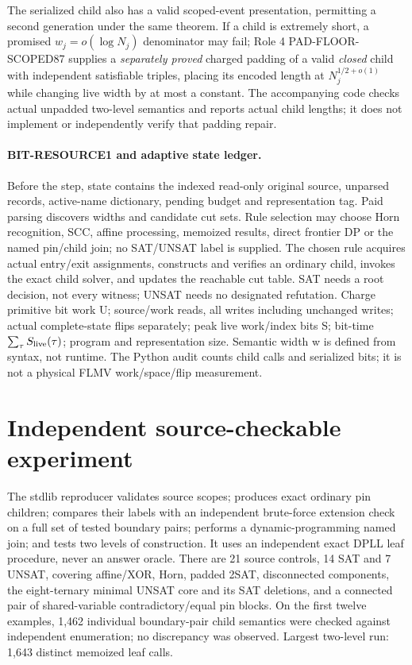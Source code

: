 \documentclass[11pt]{article}
\begin{document}
The serialized child also has a valid scoped-event presentation, permitting a second generation under the same theorem. If a child is extremely short, a promised \(w_j=o(\log N_j)\) denominator may fail; Role 4 PAD-FLOOR-SCOPED87 supplies a \emph{separately proved} charged padding of a valid \emph{closed} child with independent satisfiable triples, placing its encoded length at \(N_j^{1/2+o(1)}\) while changing live width by at most a constant. The accompanying code checks actual unpadded two-level semantics and reports actual child lengths; it does not implement or independently verify that padding repair.

\paragraph{BIT-RESOURCE1 and adaptive state ledger.}
Before the step, state contains the indexed read-only original source, unparsed records, active-name dictionary, pending budget and representation tag. Paid parsing discovers widths and candidate cut sets. Rule selection may choose Horn recognition, SCC, affine processing, memoized results, direct frontier DP or the named pin/child join; no SAT/UNSAT label is supplied. The chosen rule acquires actual entry/exit assignments, constructs and verifies an ordinary child, invokes the exact child solver, and updates the reachable cut table. SAT needs a root decision, not every witness; UNSAT needs no designated refutation. Charge primitive bit work U; source/work reads, all writes including unchanged writes; actual complete-state flips separately; peak live work/index bits S; bit-time \(\sum_{\tau}S_{\rm live}(\tau)\); program and representation size. Semantic width w is defined from syntax, not runtime. The Python audit counts child calls and serialized bits; it is not a physical FLMV work/space/flip measurement.

\section{Independent source-checkable experiment}
The stdlib reproducer validates source scopes; produces exact ordinary pin children; compares their labels with an independent brute-force extension check on a full set of tested boundary pairs; performs a dynamic-programming named join; and tests two levels of construction. It uses an independent exact DPLL leaf procedure, never an answer oracle. There are 21 source controls, 14 SAT and 7 UNSAT, covering affine/XOR, Horn, padded 2SAT, disconnected components, the eight-ternary minimal UNSAT core and its SAT deletions, and a connected pair of shared-variable contradictory/equal pin blocks. On the first twelve examples, 1,462 individual boundary-pair child semantics were checked against independent enumeration; no discrepancy was observed. Largest two-level run: 1,643 distinct memoized leaf calls.
\end{document}
